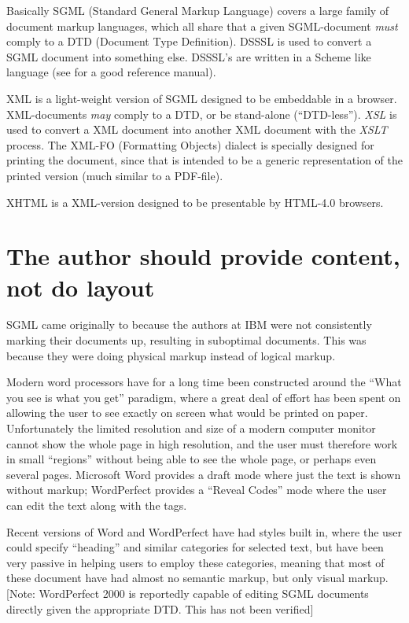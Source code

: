 Basically SGML (Standard General Markup Language) covers a large
family of document markup languages, which all share that a given
SGML-document \textit{must} comply to a DTD (Document Type
Definition).  DSSSL is used to convert a SGML document into something
else.  DSSSL's are written in a Scheme like language (see
\cite{Dybvig:1996:SPL} for a good reference manual).

XML is a light-weight version of SGML designed to be embeddable in a
browser.  XML-documents \textit{may} comply to a DTD, or be
stand-alone (``DTD-less'').  \textit{XSL} is used to convert a XML document
into another XML document with the \textit{XSLT} process.  The XML-FO
(Formatting Objects) dialect is specially designed for printing the
document, since that is intended to be a generic representation of the
printed version (much similar to a PDF-file).

XHTML is a XML-version designed to be presentable by HTML-4.0
browsers.

\section{The author should provide content, not do layout}

SGML came originally to because the authors at IBM were not
consistently marking their documents up, resulting in suboptimal
documents.  This was because they were doing physical markup instead
of logical markup.

  Modern word processors have for a long time been constructed around the
  ``What you see is what you get'' paradigm, where a great deal of
  effort has been spent on allowing the user to see exactly on screen
  what would be printed on paper.  Unfortunately the limited
  resolution and size of a modern computer monitor cannot show the
  whole page in high resolution, and the user must therefore work in
  small ``regions'' without being able to see the whole page, or
  perhaps even several pages. Microsoft Word provides a draft mode
  where just the text is shown without markup; WordPerfect provides a
  ``Reveal Codes'' mode where the user can edit the text along with
  the tags.
  
Recent versions of Word and WordPerfect have had styles built in,
where the user could specify ``heading'' and similar categories for
selected text, but have been very passive in helping users to employ
these categories, meaning that most of these document have had almost
no semantic markup, but only visual markup.  [Note: WordPerfect 2000
is reportedly capable of editing SGML documents directly given the
appropriate DTD.  This has not been verified]

